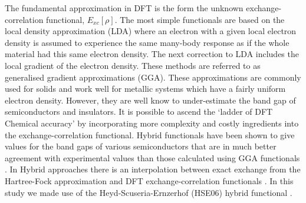 The fundamental approximation in DFT is the form the unknown exchange-correlation functional, $E_{xc}[\rho]$. The most simple functionals are based on 
the local density approximation (LDA) where an electron with a given local electron density is assumed to 
experience the same many-body response as if the whole material had this same electron density. The next correction to LDA includes the local gradient of the electron density. These methods are referred to as generalised gradient approximations (GGA). These approximations are commonly used for solids and work well for metallic systems which have a fairly uniform electron density. However, they are well know to under-estimate the band gap of semiconductors and insulators. It is possible to ascend the `ladder of DFT Chemical 
accuracy' \cite{ladder} by incorporating more complexity and costly ingredients into the exchange-correlation functional.
Hybrid functionals have been shown to give values for the band gaps of various semiconductors that are in much better agreement with experimental values than those calculated using GGA functionals \cite{hybrid_GGA_CZTS}. In Hybrid approaches there is an interpolation between exact exchange from the Hartree-Fock approximation and DFT exchange-correlation functionals \cite{Lesar}. In this study we made use of the Heyd-Scuseria-Ernzerhof (HSE06) hybrid functional \cite{HSE}.